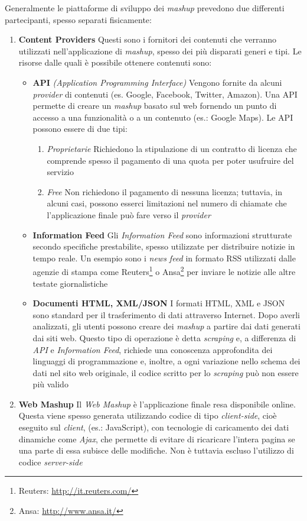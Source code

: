 Generalmente le piattaforme di sviluppo dei \emph{mashup} prevedono due differenti partecipanti, spesso separati fisicamente:

\begin{enumerate}
	\item \textbf{Content Providers}
	Questi sono i fornitori dei contenuti che verranno utilizzati nell'applicazione di \emph{mashup}, spesso dei più disparati generi e tipi.
	Le risorse dalle quali è possibile ottenere contenuti sono:
	\begin{itemize}
		\item \textbf{API}
		\emph{(Application Programming Interface)} Vengono fornite da alcuni \emph{provider} di contenuti (es. Google, Facebook, Twitter, Amazon). Una API permette di creare un \emph{mashup} basato sul web fornendo un punto di accesso a una funzionalità o a un contenuto (es.: Google Maps). Le API possono essere di due tipi:
		\begin{enumerate}
			\item \emph{Proprietarie}
			Richiedono la stipulazione di un contratto di licenza che comprende spesso il pagamento di una quota per poter usufruire del servizio
			\item \emph{Free}
			Non richiedono il pagamento di nessuna licenza; tuttavia, in alcuni casi, possono esserci limitazioni nel numero di chiamate che l'applicazione finale può fare verso il \emph{provider}
		\end{enumerate} 
		\item \textbf{Information Feed}
		Gli \emph{Information Feed} sono informazioni strutturate secondo specifiche prestabilite, spesso utilizzate per distribuire notizie in tempo reale. Un esempio sono i \emph{news feed }in formato RSS utilizzati dalle agenzie di stampa come Reuters\footnote{Reuters: \url{http://it.reuters.com/}} o Ansa\footnote{Ansa: \url{http://www.ansa.it/}} per inviare le notizie alle altre testate giornalistiche
		\item \textbf{Documenti HTML, XML/JSON}
		I formati HTML, XML e JSON sono standard per il trasferimento di dati attraverso Internet. Dopo averli analizzati, gli utenti possono creare dei \emph{mashup} a partire dai dati generati dai siti web. Questo tipo di operazione è detta \emph{scraping} e, a differenza di \emph{API} e \emph{Information Feed}, richiede una conoscenza approfondita dei linguaggi di programmazione e, inoltre, a ogni variazione nello schema dei dati nel sito web originale, il codice scritto per lo \emph{scraping} può non essere più valido
	\end{itemize} 
	\item \textbf{Web Mashup}
	Il \emph{Web Mashup} è l'applicazione finale resa disponibile online. Questa viene spesso generata utilizzando codice di tipo \emph{client-side}, cioè eseguito sul \emph{client}, (es.: JavaScript), con tecnologie di caricamento dei dati dinamiche come \emph{Ajax}, che permette di evitare di ricaricare l'intera pagina se una parte di essa subisce delle modifiche. Non è tuttavia escluso l'utilizzo di codice \emph{server-side}
\end{enumerate}

